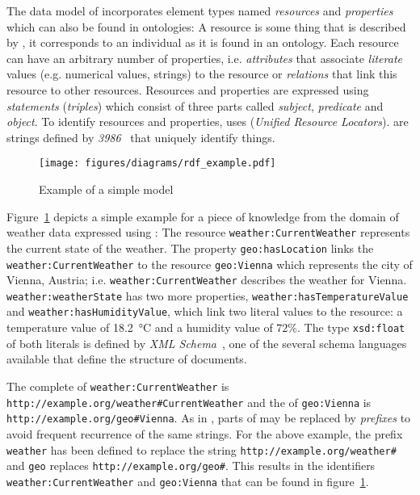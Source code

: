 The data model of  incorporates element types named \emph{resources} and \emph{properties} which can also be found in ontologies: A resource is some thing that is described by , it corresponds to an individual as it is found in an ontology. Each resource can have an arbitrary number of properties, i.e. \emph{attributes} that associate \emph{literate} values (e.g. numerical values, strings) to the resource or \emph{relations} that link this resource to other resources. Resources and properties are expressed using \emph{statements} (\emph{triples}) which consist of three parts called \emph{subject}, \emph{predicate} and \emph{object}. To identify resources and properties,  uses  (\emph{Unified Resource Locators}).  are strings defined by \emph{ 3986}~\cite{rfc3986} that uniquely identify things.

\begin{figure}
\centering
\texttt{[image: figures/diagrams/rdf\_example.pdf]}
\caption{Example of a simple  model}
\label{fig:rdf_example}
\end{figure}

Figure~\ref{fig:rdf_example} depicts a simple example for a piece of knowledge from the domain of weather data expressed using : The resource \texttt{weather:CurrentWeather} represents the current state of the weather. The property \texttt{geo:hasLocation} links the \texttt{weather:CurrentWeather} to the resource \texttt{geo:Vienna} which represents the city of Vienna, Austria; i.e. \texttt{weather:CurrentWeather} describes the weather for Vienna. \texttt{weather:weatherState} has two more properties, \texttt{weather:hasTemperatureValue} and \texttt{weather:hasHumidityValue}, which link two literal values to the resource: a temperature value of \SI{18.2}{\celsius} and a humidity value of $72 \%$. The type \texttt{xsd:float} of both literals is defined by \emph{XML Schema}~\cite{xml-schema,xml-schema-datatypes}, one of the several  schema languages available that define the structure of  documents.

The complete  of \texttt{weather:CurrentWeather} is \texttt{http://example.org/weather\#CurrentWeather} and the  of \texttt{geo:Vienna} is \texttt{http://example.org/geo\#Vienna}. As in , parts of  may be replaced by \emph{prefixes} to avoid frequent recurrence of the same strings. For the above example, the prefix \texttt{weather} has been defined to replace the string \texttt{http://example.org/weather\#} and \texttt{geo} replaces \texttt{http://example.org/geo\#}. This results in the identifiers \texttt{weather:CurrentWeather} and \texttt{geo:Vienna} that can be found in figure~\ref{fig:rdf_example}.

